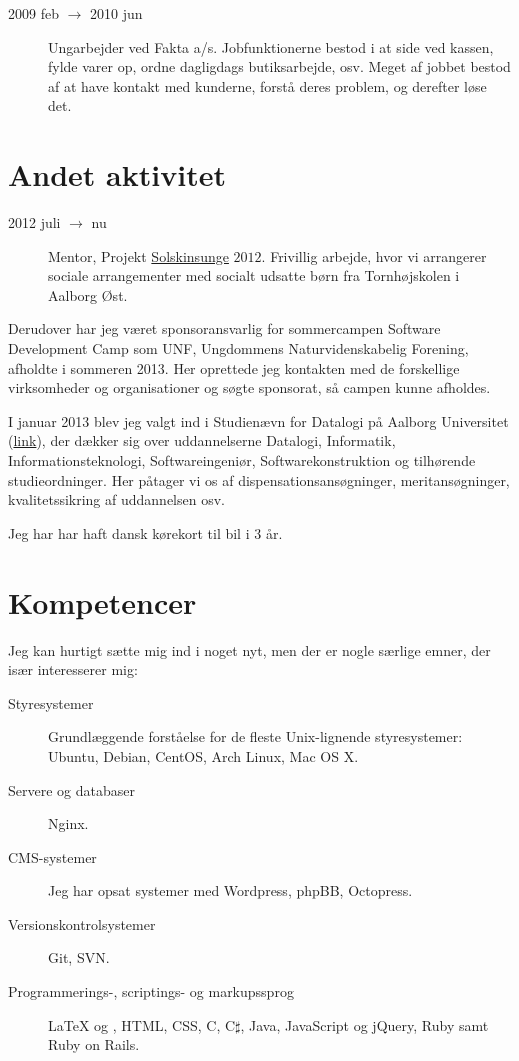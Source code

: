 \documentclass[margin,line,a4paper]{resume}
\begin{document}
\begin{resume}
\begin{description}
  \item[2009 feb $\rightarrow$ 2010 jun] Ungarbejder ved Fakta
    a/s. Jobfunktionerne bestod i at side ved kassen, fylde varer op,
    ordne dagligdags butiksarbejde, osv. Meget af jobbet bestod af at have
    kontakt med kunderne, forstå deres problem, og derefter løse det.
\end{description}

\section{\mysidestyle Andet aktivitet}\vspace{1mm}
\begin{description}
  \item[2012 juli $\rightarrow$ nu] Mentor, Projekt
    \href{http://www.urk.dk/solskinsunge/}{Solskinsunge} $2012$. Frivillig
    arbejde, hvor vi arrangerer sociale arrangementer med socialt udsatte
    børn fra Tornhøjskolen i Aalborg Øst.
\end{description}
Derudover har jeg været sponsoransvarlig for sommercampen Software
Development Camp som UNF, Ungdommens Naturvidenskabelig Forening,
afholdte i sommeren 2013. Her oprettede jeg kontakten med de
forskellige virksomheder og organisationer og søgte sponsorat, så campen
kunne afholdes.

I januar 2013 blev jeg valgt ind i
Studienævn for Datalogi på Aalborg Universitet
(\href{http://www.sict.aau.dk/studienaevn-for-datalogi/}{link}),
der dækker sig over uddannelserne Datalogi, Informatik,
Informationsteknologi, Softwareingeniør, Softwarekonstruktion
og tilhørende studieordninger. Her påtager vi os af
dispensationsansøgninger, meritansøgninger, kvalitetssikring af
uddannelsen osv.

Jeg har har haft dansk kørekort til bil i $3$ år.

\section{\mysidestyle Kompetencer} \vspace{1mm}
Jeg kan hurtigt sætte mig ind i noget nyt, men der er nogle særlige
emner, der især interesserer mig:
\vspace{0.5cm}
\begin{description}
  \item[Styresystemer] Grundlæggende forståelse for de fleste
    Unix-lignende styresystemer: Ubuntu, Debian, CentOS, Arch Linux, Mac OS
    X.
  \item[Servere og databaser] Nginx. 
  \item[CMS-systemer] Jeg har opsat systemer med Wordpress, phpBB,
    Octopress.
  \item[Versionskontrolsystemer] Git, SVN.
  \item[Programmerings-, scriptings- og markupssprog] \LaTeX{} og
  \XeTeX{}, HTML, CSS, C, C$\sharp$, Java, JavaScript og jQuery, Ruby samt Ruby
  on Rails.
\end{description}


\end{resume}
\end{document}
